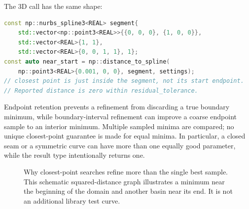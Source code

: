 The 3D call has the same shape:
\par\noindent\begin{minipage}{\linewidth}
\begin{lstlisting}[language=C++]
const np::nurbs_spline3<REAL> segment{
    std::vector<np::point3<REAL>>{{0, 0, 0}, {1, 0, 0}},
    std::vector<REAL>{1, 1},
    std::vector<REAL>{0, 0, 1, 1}, 1};
const auto near_start = np::distance_to_spline(
    np::point3<REAL>{0.001, 0, 0}, segment, settings);
// closest point is just inside the segment, not its start endpoint.
// Reported distance is zero within residual_tolerance.
\end{lstlisting}
\end{minipage}\par
Endpoint retention prevents a refinement from discarding a true boundary
minimum, while boundary-interval refinement can improve a coarse endpoint
sample to an interior minimum. Multiple sampled minima are compared; no unique
closest-point guarantee is made for equal minima. In particular, a closed seam
or a symmetric curve can have more than one equally good parameter, while the
result type intentionally returns one.

\begin{figure}[htbp]
\centering
{}
\caption{Why closest-point searches refine more than the single best sample.
This schematic squared-distance graph illustrates a minimum near the beginning
of the domain and another basin near its end. It is not an additional library
test curve.}
\label{fig:distance-basins}
\end{figure}

